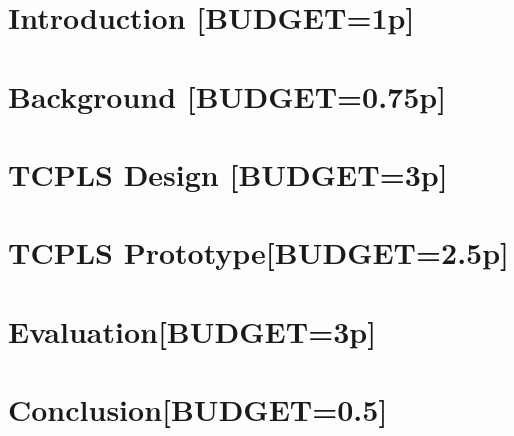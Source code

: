 \section{Introduction [BUDGET=1p]}
\label{sec:intro}




\section{Background [BUDGET=0.75p]}
\label{sec:background}


\section{TCPLS Design [BUDGET=3p]}
\label{sec:background-design}




\section{TCPLS Prototype[BUDGET=2.5p]}
\label{sec:prototype}



\section{Evaluation[BUDGET=3p]}
\label{sec:evaluation}


\section{Conclusion[BUDGET=0.5]}
\label{sec:conclusion}




%


%


